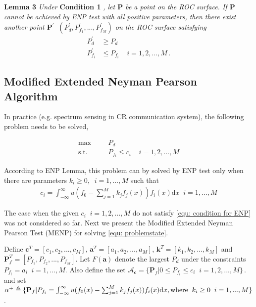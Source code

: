 \documentclass[12pt,journal,a4paper,twoside,onecolumn]{IEEEtran}
\begin{document}
\begin{spacing}{2.5}
\noindent \textbf{Lemma 3}
\textit{
\noindent
Under}
\textbf{Condition 1}
\textit{, let $\mathbf{P}$ be a point on the ROC surface. If  $\mathbf{P}$ cannot be achieved by ENP test with all positive parameters, then there  exist another point $\mathbf{P}^\prime\;\; (P_d^\prime, P_{f_1}^\prime, ..., P_{f_M}^\prime)$ on the ROC surface satisfying
}
\begin{equation}
  \label{equ: lemma 3 equation}
  \begin{split}
    P_d^\prime &\geq P_d\\
    P_{f_i}^\prime &\leq P_{f_i}\;\;\;\;i = 1, 2, ..., M\,.
  \end{split}
\end{equation}

\subsection{Modified Extended Neyman Pearson Algorithm}


In practice (e.g. spectrum sensing in CR communication system), the following problem needs to be solved,

      \begin{equation}
      \label{equ: problemstate}
      \begin{split}
      \max\;\;\;\;\;\;&P_d\\
      \text{s.t.}\;\;\;\;\;\;&P_{f_i} \leq c_i\;\;\;\;i = 1, 2, ..., M
      \end{split}
      \end{equation}

According to ENP Lemma, this problem can by solved by ENP test only when there are parameters $k_i \geq 0, \;\;i=1, ..., M$ such that 
\begin{equation}
\label{equ: condition for ENP}
\begin{split}
c_i = \int_{-\infty}^{\infty}u(f_0 - \sum_{j=1}^{M}k_jf_j(x))f_i(x)\mathrm{d}x \;\;i = 1, ..., M
\end{split}
\end{equation}

The case when the given $c_i\;\;i = 1, 2, ..., M$ do not satisfy \eqref{equ: condition for ENP} was not considered so far. Next we present the Modified Extended Neyman Pearson Test (MENP) for solving \eqref{equ: problemstate}.

\def \JUDGEMENT{u(f_0(x) - \sum_{j=1}^{M}k_j f_j(x))}

Define $\mathbf{c}^T = [c_1, c_2, ..., c_M]$, $\mathbf{a}^T=[a_1, a_2, ..., a_M]$, $\mathbf{k}^T = [k_1, k_2, ..., k_M]$ and  $\mathbf{P}_f^T = [P_{f_1}, P_{f_2}, ..., P_{f_M}]$. Let
$F(\mathbf{a})$ denote the largest $P_d$ under the constraints $P_{f_i} = a_i\;\;i = 1, ..., M$.
Also define the set $\mathcal{A}_\mathbf{c} = \{
  \mathbf{P}_f | 0 \leq P_{f_i} \leq c_i
  \;\;i=1, 2, ..., M\}\,.
$ and set $\alpha^+ \triangleq \{\mathbf{P}_f | P_{f_i} = \int_{-\infty}^{\infty} \JUDGEMENT f_i(x) \mathrm{d}x, \text{where\;\;} k_i \geq 0 \;\;i=1, ..., M\}$.


\end{spacing}
\end{document}

